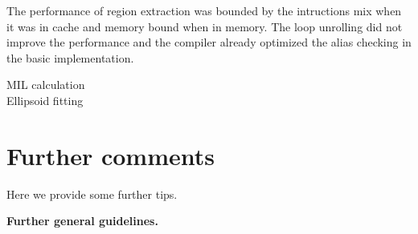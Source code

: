 \documentclass[letterpaper]{article}
\newcommand{\mypar}[1]{{\bf #1.}}
\begin{document}
The performance of region extraction was bounded by the intructions mix when it was in cache and memory bound when in memory. The loop unrolling did not improve the performance and the compiler already optimized the alias checking in the basic implementation.

MIL calculation\\

Ellipsoid fitting\\


\section{Further comments}

Here we provide some further tips.

\mypar{Further general guidelines}



\end{document}
